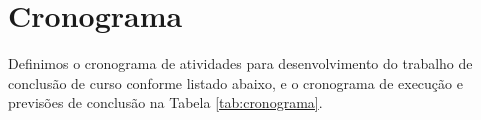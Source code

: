 \chapter{Cronograma}\label{cap:desenvolvimento}
Definimos o cronograma de atividades para desenvolvimento do trabalho de conclusão de curso conforme listado abaixo, e o cronograma de execução e previsões de conclusão na Tabela \ref{tab:cronograma}.


